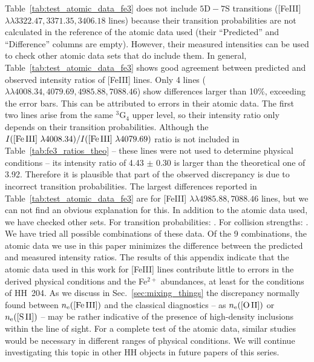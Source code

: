 \documentclass[twocolumn,linenumbers]{aastex63}
\begin{document}
Table~\ref{tab:test_atomic_data_fe3} does not include $5\text{D}-7\text{S}$ transitions ([Fe\thinspace III] $\lambda \lambda 3322.47, 3371.35, 3406.18$ lines) because their transition probabilities are not calculated in the reference of the atomic data used (their ``Predicted'' and ``Difference'' columns are empty). However, their measured intensities can be used to check other atomic data sets that do include them. In general,  Table~\ref{tab:test_atomic_data_fe3} shows good agreement between  predicted and observed intensity ratios of  [Fe\thinspace III] lines. Only 4 lines ($\lambda \lambda 4008.34, 4079.69, 4985.88, 7088.46$) show differences larger than 10\%, exceeding the error bars. This can be attributed to errors in their atomic data. The first two lines arise from the same $^3\text{G}_4$ upper level, so their intensity ratio only depends on their transition probabilities. Although the $I(\text{[Fe\thinspace III] } \lambda 4008.34)/I(\text{[Fe\thinspace III] } \lambda 4079.69)$ ratio is not included in Table~\ref{tab:fe3_ratios_theo} -- these lines were not used to determine physical conditions -- its intensity ratio of 4.43 $\pm$ 0.30 is larger than the theoretical one of 3.92. Therefore it is plausible that part of the observed discrepancy is due to incorrect transition probabilities. The largest differences reported in Table~\ref{tab:test_atomic_data_fe3} are for [Fe\thinspace III] $\lambda \lambda 4985.88, 7088.46$ lines, but we can not find an obvious explanation for this.
In addition to the atomic data used, we have checked other sets. For transition probabilities: \citet[][]{NP96,BBQ10}. For collision strengths: \citet[][]{BBQ10,BB14}. We have tried all possible combinations of these data. Of the 9 combinations, the atomic data we use in this paper minimizes the difference between the predicted and measured intensity ratios. The results of this appendix indicate that the atomic data used in this work for [Fe\thinspace III] lines contribute little to errors in the derived physical conditions and the Fe$^{2+}$ abundances, at least for the conditions of HH~204. As we discuss in Sec.~\ref{sec:mixing_things} the discrepancy normally found between $n_{\rm e}(\text{[Fe\thinspace III]})$ and the classical diagnostics -- as $n_{\rm e}(\text{[O\thinspace II]})$ or $n_{\rm e}(\text{[S\thinspace II]})$ -- may be rather indicative of the presence of high-density inclusions within the line of sight. For a complete test of the atomic data, similar studies would be necessary in different ranges of physical conditions. We will continue investigating this topic in other HH objects in future papers of this series.  
\end{document}
